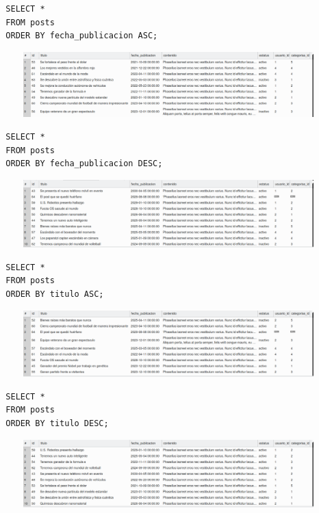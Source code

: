 \documentclass{article}
\begin{document}
\begin{verbatim}
  SELECT *
  FROM posts
  ORDER BY fecha_publicacion ASC;
\end{verbatim}

\begin{figure}[h!]
  \centering
  \includegraphics[scale=0.5]{./Pictures/123_order_by_asc.png}
\end{figure}

\begin{verbatim}
  SELECT *
  FROM posts
  ORDER BY fecha_publicacion DESC;
\end{verbatim}

\begin{figure}[h!]
  \centering
  \includegraphics[scale=0.5]{./Pictures/124_order_by_desc.png}
\end{figure}

\begin{verbatim}
  SELECT *
  FROM posts
  ORDER BY titulo ASC;
\end{verbatim}

\begin{figure}[h!]
  \centering
  \includegraphics[scale=0.5]{./Pictures/125_order_by_titulo.png}
\end{figure}

\begin{verbatim}
  SELECT *
  FROM posts
  ORDER BY titulo DESC;
\end{verbatim}

\begin{figure}[h!]
  \centering
  \includegraphics[scale=0.5]{./Pictures/126_order_by_titulo.png}
\end{figure}
\end{document}
